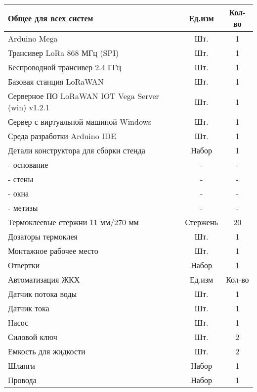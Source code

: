 \begin{tabular}{|p{10cm}|c|c|}
    \hline
    Общее для всех систем & Ед.изм & Кол-во \\
    \hline
    Arduino Mega & Шт. & 1 \\
    Трансивер LoRa 868 МГц (SPI) & Шт. & 1 \\
    Беспроводной трансивер 2.4 ГГц & Шт. & 1  \\
    Базовая станция LoRaWAN & Шт. & 1 \\
    Серверное ПО LoRaWAN IOT Vega Server (win) v1.2.1 & Шт. & 1 \\
    Сервер с виртуальной машиной Windows & Шт. & 1  \\
    Среда разработки Arduino IDE & Шт. & 1 \\
    Детали конструктора для сборки стенда & Набор & 1 \\
    - основание & - & - \\
    - стены	& - & - \\
    - окна & - & - \\
    - метизы & - & - \\
    Термоклеевые стержни 11 мм/270 мм & Стержень & 20 \\
    Дозаторы термоклея & Шт. & 1 \\
    Монтажное рабочее место & Шт. & 1 \\
    Отвертки & Набор & 1 \\ 
    \hline
    \hline
    Автоматизация ЖКХ & Ед.изм & Кол-во	 \\
    \hline
    Датчик потока воды & Шт. & 1 \\
    Датчик тока & Шт. & 1 \\
    Насос & Шт. & 1 \\
    Силовой ключ & Шт. & 2 \\
    Емкость для жидкости & Шт. & 2 \\
    Шланги & Набор & 1 \\
    Провода & Набор & 1 \\ 
    \hline            
\end{tabular}


